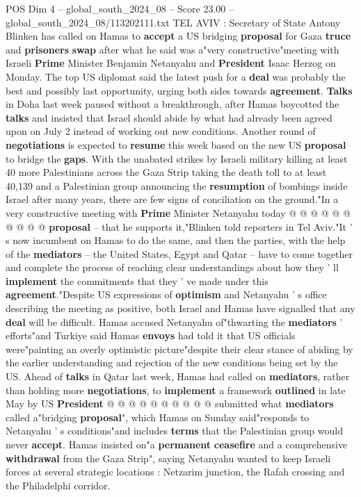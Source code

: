 \begin{textsample}{POS Dim 4 – global\_south\_2024\_08 – Score 23.00 – global\_south\_2024\_08/113202111.txt}  \label{ex:f4_pos_127}
TEL AVIV : Secretary of State Antony Blinken has called on Hamas to \textbf{accept} a US bridging \textbf{proposal} for Gaza \textbf{truce} and \textbf{prisoners} \textbf{swap} after what he said was a"very constructive"meeting with Israeli \textbf{Prime} Minister Benjamin Netanyahu and \textbf{President} Isaac Herzog on Monday.
The top US diplomat said the latest push for a \textbf{deal} was probably the best and possibly last opportunity, urging both sides towards \textbf{agreement}. \textbf{Talks} in Doha last week paused without a breakthrough, after Hamas boycotted the \textbf{talks} and insisted that Israel should abide by what had already been agreed upon on July 2 instead of working out new conditions.
Another round of \textbf{negotiations} is expected to \textbf{resume} this week based on the new US \textbf{proposal} to bridge the \textbf{gaps}.
With the unabated strikes by Israeli military killing at least 40 more Palestinians across the Gaza Strip taking the death toll to at least 40,139 and a Palestinian group announcing the \textbf{resumption} of bombings inside Israel after many years, there are few signs of conciliation on the ground."In a very constructive meeting with \textbf{Prime} Minister Netanyahu today @ @ @ @ @ @ @ @ @ @ \textbf{proposal} -- that he supports it,"Blinken told reporters in Tel Aviv."It ' s now incumbent on Hamas to do the same, and then the parties, with the help of the \textbf{mediators} -- the United States, Egypt and Qatar -- have to come together and complete the process of reaching clear understandings about how they ' ll \textbf{implement} the commitments that they ' ve made under this \textbf{agreement}."Despite US expressions of \textbf{optimism} and Netanyahu ' s office describing the meeting as positive, both Israel and Hamas have signalled that any \textbf{deal} will be difficult.
Hamas accused Netanyahu of"thwarting the \textbf{mediators} ' efforts"and Turkiye said Hamas \textbf{envoys} had told it that US officials were"painting an overly optimistic picture"despite their clear stance of abiding by the earlier understanding and rejection of the new conditions being set by the US.
Ahead of \textbf{talks} in Qatar last week, Hamas had called on \textbf{mediators}, rather than holding more \textbf{negotiations}, to \textbf{implement} a framework \textbf{outlined} in late May by US \textbf{President} @ @ @ @ @ @ @ @ @ @ submitted what \textbf{mediators} called a"bridging \textbf{proposal}", which Hamas on Sunday said"responds to Netanyahu ' s conditions"and includes \textbf{terms} that the Palestinian group would never \textbf{accept}.
Hamas insisted on"a \textbf{permanent} \textbf{ceasefire} and a comprehensive \textbf{withdrawal} from the Gaza Strip", saying Netanyahu wanted to keep Israeli forces at several strategic locations : Netzarim junction, the Rafah crossing and the Philadelphi corridor.

\end{textsample}
